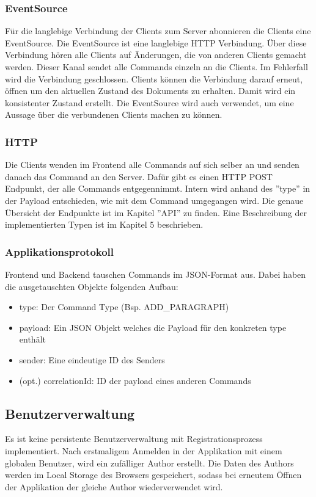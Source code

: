\subsubsection{EventSource}
Für die langlebige Verbindung der Clients zum Server abonnieren die Clients eine EventSource.
Die EventSource ist eine langlebige HTTP Verbindung.
Über diese Verbindung hören alle Clients auf Änderungen, die von anderen Clients gemacht werden.
Dieser Kanal sendet alle Commands einzeln an die Clients.
Im Fehlerfall wird die Verbindung geschlossen.
Clients können die Verbindung darauf erneut, öffnen um den aktuellen Zustand des Dokuments zu erhalten.
Damit wird ein konsistenter Zustand erstellt.
Die EventSource wird auch verwendet, um eine Aussage über die verbundenen Clients machen zu können.

\subsubsection{HTTP}
Die Clients wenden im Frontend alle Commands auf sich selber an und senden danach das Command an den Server.
Dafür gibt es einen HTTP POST Endpunkt, der alle Commands entgegennimmt.
Intern wird anhand des ''type'' in der Payload entschieden, wie mit dem Command umgegangen wird.
Die genaue Übersicht der Endpunkte ist im Kapitel ''API'' zu finden.
Eine Beschreibung der implementierten Typen ist im Kapitel 5 beschrieben.

\subsubsection{Applikationsprotokoll}

Frontend und Backend tauschen Commands im JSON-Format aus.
Dabei haben die ausgetauschten Objekte folgenden Aufbau:

\begin{itemize}
    \item type: Der Command Type (Bsp. ADD\_PARAGRAPH)
    \item payload: Ein JSON Objekt welches die Payload für den konkreten type enthält
    \item sender: Eine eindeutige ID des Senders
    \item (opt.) correlationId: ID der payload eines anderen Commands
\end{itemize}

\subsection{Benutzerverwaltung}
Es ist keine persistente Benutzerverwaltung mit Registrationsprozess implementiert.
Nach erstmaligem Anmelden in der Applikation mit einem globalen Benutzer, wird ein zufälliger Author erstellt.
Die Daten des Authors werden im Local Storage des Browsers gespeichert, sodass bei erneutem Öffnen der Applikation der gleiche Author wiederverwendet wird.
